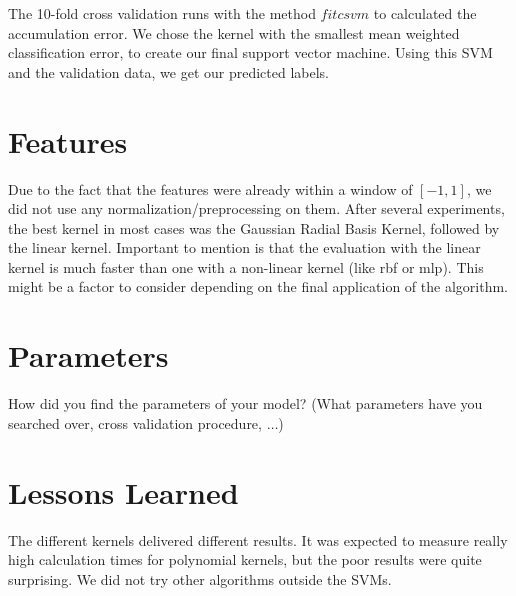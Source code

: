 \documentclass[a4paper, 11pt]{article}
\begin{document}
The 10-fold cross validation runs with the method $fitcsvm$ to calculated the accumulation error. We chose the kernel with the smallest mean weighted classification error, to create our final support vector machine.
Using this SVM and the validation data, we get our predicted labels.

\section{Features}

Due to the fact that the features were already within a window of $[-1,1]$, we did not use any normalization/preprocessing on them. After several experiments, the best kernel in most cases was the Gaussian Radial Basis Kernel, followed by the linear kernel. Important to mention is that the evaluation with the linear kernel is much faster than one with a non-linear kernel (like rbf or mlp). This might be a factor to consider depending on the final application of the algorithm.

\section{Parameters}
How did you find the parameters of your model? (What parameters have you searched over, cross validation procedure, $\ldots$)

\section{Lessons Learned} 

The different kernels delivered different results. It was expected to measure really high calculation times for polynomial kernels, but the poor results were quite surprising.
We did not try other algorithms outside the SVMs.
\end{document}
